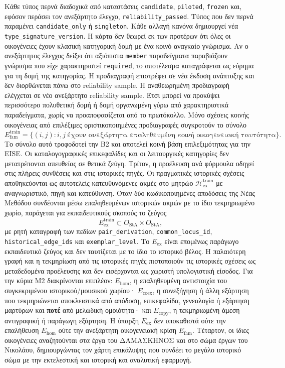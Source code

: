 \documentclass[11pt,a4paper]{article}
\begin{document}
Κάθε τύπος περνά διαδοχικά από καταστάσεις \texttt{candidate}, \texttt{piloted}, \texttt{frozen} και, εφόσον περάσει τον ανεξάρτητο έλεγχο, \texttt{reliability\_passed}. Τύπος που δεν περνά παραμένει \texttt{candidate\_only} ή \texttt{singleton}. Κάθε αλλαγή κανόνα δημιουργεί νέα \texttt{type\_signature\_version}. Η κάρτα δεν θεωρεί εκ των προτέρων ότι όλες οι οικογένειες έχουν κλασική κατηγορική δομή με ένα κοινό αναγκαίο γνώρισμα. Αν ο ανεξάρτητος έλεγχος δείξει ότι αξιόπιστα \texttt{member} παραδείγματα παραβιάζουν γνώρισμα που είχε χαρακτηριστεί \texttt{required}, το αποτέλεσμα καταγράφεται ως εύρημα για τη δομή της κατηγορίας. Η προδιαγραφή επιστρέφει σε νέα έκδοση ανάπτυξης και δεν διορθώνεται πάνω στο reliability sample. Η αναθεωρημένη προδιαγραφή ελέγχεται σε νέο ανεξάρτητο reliability sample. Έτσι μπορεί να προκύψει περισσότερο πολυθετική δομή ή δομή οργανωμένη γύρω από χαρακτηριστικά παραδείγματα, χωρίς να προαποφασίζεται από το πρωτόκολλο. Μόνο σχέσεις κοινής οικογένειας από επιλέξιμες οριστικοποιημένες προδιαγραφές συγκροτούν το σύνολο
\[
E_{\mathrm{fam}}^{\mathrm{train}}
=\{(i,j): i,j\ \text{έχουν ανεξάρτητα επαληθευμένη κοινή οικογενειακή ταυτότητα}\}.
\]
Το σύνολο αυτό τροφοδοτεί την B2 και αποτελεί κοινή βάση επιλεξιμότητας για την EISE. Οι καταλογογραφικές επικεφαλίδες και οι λειτουργικές κατηγορίες δεν μετατρέπονται απευθείας σε θετικά ζεύγη. Τρίτον, η προέλευση ανά φόρμουλα οδηγεί στις πλήρεις συνθέσεις και στις ιστορικές πηγές. Οι πραγματικές ιστορικές σχέσεις αποθηκεύονται ως αυτοτελείς κατευθυνόμενες ακμές στο μητρώο $\mathcal H_{\mathrm{ex}}^{\mathrm{train}}$ με αναγνωριστικό, πηγή και κατεύθυνση. Όταν δύο κωδικοποιημένες αποδόσεις της Νέας Μεθόδου συνδέονται μέσω επαληθευμένων ιστορικών ακμών με το ίδιο τεκμηριωμένο χωρίο, παράγεται για εκπαιδευτικούς σκοπούς το ζεύγος
\[
E_{\mathrm{ex}}^{\mathrm{train}}\subset O_{\mathrm{StA}}\times O_{\mathrm{StA}},
\]
με ρητή καταγραφή των πεδίων \texttt{pair\_\allowbreak derivation}, \texttt{common\_\allowbreak locus\_\allowbreak id}, \texttt{historical\_\allowbreak edge\_\allowbreak ids} και \texttt{exemplar\_\allowbreak level}. Το $E_{\mathrm{ex}}$ είναι επομένως παράγωγο εκπαιδευτικό ζεύγος και δεν ταυτίζεται με το ίδιο το ιστορικό βέλος. Η παλαιότερη γραφή και η τεκμηρίωση από τις ιστορικές πηγές πιστοποιούν τις ιστορικές σχέσεις ως μεταδεδομένα προέλευσης και δεν εισέρχονται ως χωριστή υπολογιστική είσοδος. Για την κύρια M2 διακρίνονται επιπλέον: $E_{\mathrm{hom}}$, η επαληθευμένη αντιστοιχία του συγκεκριμένου ιστορικού/μουσικού χωρίου· $E_{\mathrm{coex}}$, η συνεξήγηση ή άλλη εξάρτηση που τεκμηριώνεται αποκλειστικά από απόδοση, επικεφαλίδα, γενεαλογία ή εξάρτηση μαρτύρων και \textbf{ποτέ} από μελωδική ομοιότητα· και $E_{\mathrm{copy}}$, η τεκμηριωμένη άμεση αντιγραφική ή παράγωγη εξάρτηση. Η ύπαρξη $E_{\mathrm{ex}}$ δεν υποκαθιστά ούτε την επαλήθευση $E_{\mathrm{hom}}$ ούτε την ανεξάρτητη οικογενειακή κρίση $E_{\mathrm{fam}}$. Τέταρτον, οι ίδιες οικογένειες αναζητούνται στα έργα του ΔΑΜΑΣΚΗΝΟΣ και στο σώμα έργων του Νικολάου, δημιουργώντας τον χάρτη επικάλυψης που συνδέει το μεγάλο ιστορικό σώμα με την εκτελεστική και ιστορική και αναλυτική εφαρμογή.
\end{document}
